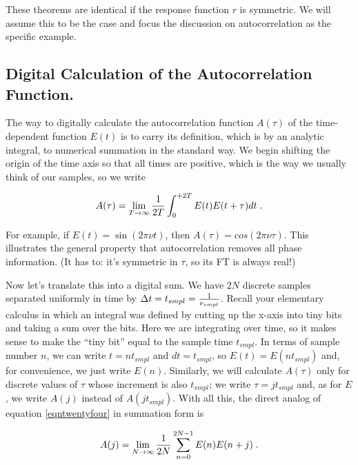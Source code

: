 \documentclass[psfig,preprint]{aastex}
\begin{document}
	These theorems are identical if the response function $r$ is
symmetric. We will assume this to be the case and focus the discussion
on autocorrelation as the specific example.

\subsection{Digital Calculation of the Autocorrelation Function.} 

\label{elevenpone}

	The way to digitally calculate the autocorrelation function
$A(\tau)$ of the time-dependent function $E(t)$ is to carry its
definition, which is by an analytic integral, to numerical summation in
the standard way.  We begin shifting the origin of the time axis so that
all times are positive, which is the way we usually think of our
samples, so we write

\begin{equation} \label{eqntwentyfour}
A(\tau) = \lim_{T \to \infty} {1 \over 2T}
\int_0^{+2T} E(t) E(t + \tau) dt \; .
\end{equation}

\noindent For example, if $E(t) = \sin( 2 \pi \nu t)$, then $A(\tau) =
cos(2 \pi \nu \tau)$. This illustrates the general property that
autocorrelation removes all phase information. (It has to: it's
symmetric in $\tau$, so its FT is always real!)

        Now let's translate this into a digital sum.  We have $2N$
discrete samples separated uniformly in time by $\Delta t = t_{smpl} = 
{1 \over \nu_{smpl}}$.  Recall your elementary calculus in which an    
integral was defined by cutting up the x-axis into tiny bits and taking
a sum over the bits.  Here we are integrating over time, so it makes   
sense to make the ``tiny bit'' equal to the sample time $t_{smpl}$.  In
terms of sample number $n$, we can write $t = nt_{smpl}$ and $dt =
t_{smpl}$, so $E(t) = E(nt_{smpl})$ and, for convenience, we just write 
$E(n)$.  Similarly, we will calculate $A(\tau)$ only for discrete values
of $\tau$ whose increment is also $t_{smpl}$; we write $\tau = j
t_{smpl}$ and, as for $E$, we write $A(j)$ instead of $A(jt_{smpl})$.
With all this, the direct analog of equation \ref{eqntwentyfour} in
summation form is

\begin{equation}
A(j) = \lim_{N \to \infty} {1 \over 2N}
\sum_{n=0}^{2N-1} E(n) E(n + j) \; .
\end{equation}
\end{document}
